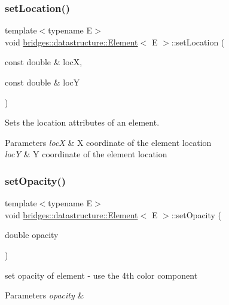 \subsubsection{\texorpdfstring{set\+Location()}{setLocation()}}
{\footnotesize\ttfamily template$<$typename E$>$ \\
void \hyperlink{classbridges_1_1datastructure_1_1_element}{bridges\+::datastructure\+::\+Element}$<$ E $>$\+::set\+Location (\begin{DoxyParamCaption}\item[{const double \&}]{locX,  }\item[{const double \&}]{locY }\end{DoxyParamCaption})\hspace{0.3cm}{\ttfamily [inline]}}

Sets the location attributes of an element.


\begin{DoxyParams}{Parameters}
{\em locX} & X coordinate of the element location \\
\hline
{\em locY} & Y coordinate of the element location \\
\hline
\end{DoxyParams}
\mbox{\label{classbridges_1_1datastructure_1_1_element_acb5d0b5734a6b3c17b7b1784ae1dc79c}} 
\subsubsection{\texorpdfstring{set\+Opacity()}{setOpacity()}}
{\footnotesize\ttfamily template$<$typename E$>$ \\
void \hyperlink{classbridges_1_1datastructure_1_1_element}{bridges\+::datastructure\+::\+Element}$<$ E $>$\+::set\+Opacity (\begin{DoxyParamCaption}\item[{double}]{opacity }\end{DoxyParamCaption})\hspace{0.3cm}{\ttfamily [inline]}}

set opacity of element -\/ use the 4th color component


\begin{DoxyParams}{Parameters}
{\em opacity} & \\
\hline
\end{DoxyParams}
\mbox{\label{classbridges_1_1datastructure_1_1_element_a1ef398bf1027244a624575e58a569ed9}} 
